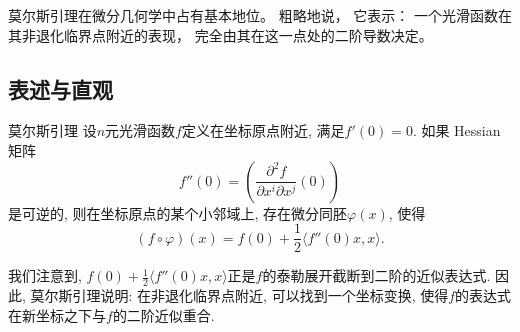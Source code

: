 
\begin{issues}
\issueTODO
\issueDraft
\end{issues}


莫尔斯引理在微分几何学中占有基本地位。 粗略地说， 它表示： 一个光滑函数在其非退化临界点附近的表现， 完全由其在这一点处的二阶导数决定。

\subsection{表述与直观}
\begin{lemma}{莫尔斯引理}
设$n$元光滑函数$f$定义在坐标原点附近, 满足$f'(0)=0$. 如果 Hessian 矩阵
$$
f''(0)=\left(\frac{\partial^2f}{\partial x^i\partial x^j}(0)\right)
$$
是可逆的, 则在坐标原点的某个小邻域上, 存在微分同胚$\varphi(x)$, 使得
$$
(f\circ\varphi)(x)=f(0)+\frac{1}{2}\langle f''(0)x,x\rangle.
$$
\end{lemma}

我们注意到, $f(0)+\frac{1}{2}\langle f''(0)x,x\rangle$正是$f$的泰勒展开截断到二阶的近似表达式. 因此, 莫尔斯引理说明: 在非退化临界点附近, 可以找到一个坐标变换, 使得$f$的表达式在新坐标之下与$f$的二阶近似重合.

